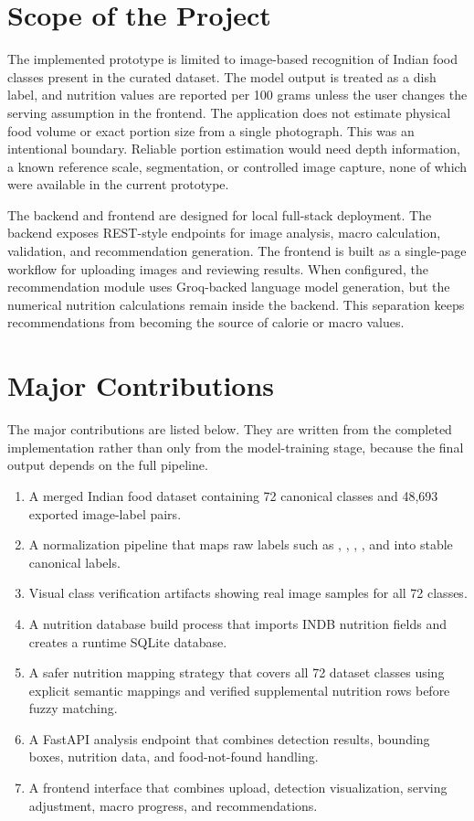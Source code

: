 \section{Scope of the Project}

The implemented prototype is limited to image-based recognition of Indian food classes present in the curated dataset. The model output is treated as a dish label, and nutrition values are reported per 100 grams unless the user changes the serving assumption in the frontend. The application does not estimate physical food volume or exact portion size from a single photograph. This was an intentional boundary. Reliable portion estimation would need depth information, a known reference scale, segmentation, or controlled image capture, none of which were available in the current prototype.

The backend and frontend are designed for local full-stack deployment. The backend exposes REST-style endpoints for image analysis, macro calculation, validation, and recommendation generation. The frontend is built as a single-page workflow for uploading images and reviewing results. When configured, the recommendation module uses Groq-backed language model generation, but the numerical nutrition calculations remain inside the backend. This separation keeps recommendations from becoming the source of calorie or macro values.

\section{Major Contributions}

The major contributions are listed below. They are written from the completed implementation rather than only from the model-training stage, because the final output depends on the full pipeline.

\begin{enumerate}[label=\arabic*.]
    \item A merged Indian food dataset containing 72 canonical classes and 48,693 exported image-label pairs.
    \item A normalization pipeline that maps raw labels such as , , , , and  into stable canonical labels.
    \item Visual class verification artifacts showing real image samples for all 72 classes.
    \item A nutrition database build process that imports INDB nutrition fields and creates a runtime SQLite database.
    \item A safer nutrition mapping strategy that covers all 72 dataset classes using explicit semantic mappings and verified supplemental nutrition rows before fuzzy matching.
    \item A FastAPI analysis endpoint that combines detection results, bounding boxes, nutrition data, and food-not-found handling.
    \item A frontend interface that combines upload, detection visualization, serving adjustment, macro progress, and recommendations.
\end{enumerate}

